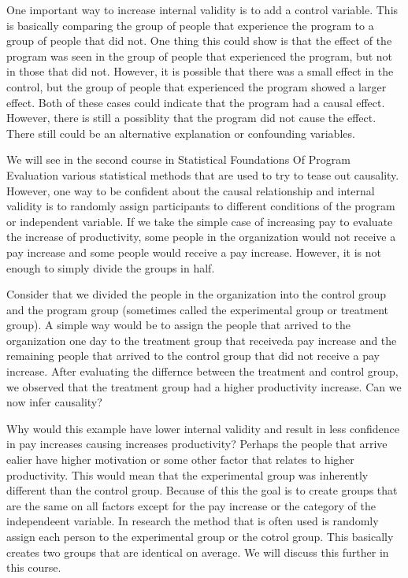 \documentclass[]{book}
\theoremstyle{definition}
\theoremstyle{definition}
\theoremstyle{definition}
\theoremstyle{remark}
\begin{document}
One important way to increase internal validity is to add a control
variable. This is basically comparing the group of people that
experience the program to a group of people that did not. One thing this
could show is that the effect of the program was seen in the group of
people that experienced the program, but not in those that did not.
However, it is possible that there was a small effect in the control,
but the group of people that experienced the program showed a larger
effect. Both of these cases could indicate that the program had a causal
effect. However, there is still a possiblity that the program did not
cause the effect. There still could be an alternative explanation or
confounding variables.

We will see in the second course in Statistical Foundations Of Program
Evaluation various statistical methods that are used to try to tease out
causality. However, one way to be confident about the causal
relationship and internal validity is to randomly assign participants to
different conditions of the program or independent variable. If we take
the simple case of increasing pay to evaluate the increase of
productivity, some people in the organization would not receive a pay
increase and some people would receive a pay increase. However, it is
not enough to simply divide the groups in half.

Consider that we divided the people in the organization into the control
group and the program group (sometimes called the experimental group or
treatment group). A simple way would be to assign the people that
arrived to the organization one day to the treatment group that
receiveda pay increase and the remaining people that arrived to the
control group that did not receive a pay increase. After evaluating the
differnce between the treatment and control group, we observed that the
treatment group had a higher productivity increase. Can we now infer
causality?

Why would this example have lower internal validity and result in less
confidence in pay increases causing increases productivity? Perhaps the
people that arrive ealier have higher motivation or some other factor
that relates to higher productivity. This would mean that the
experimental group was inherently different than the control group.
Because of this the goal is to create groups that are the same on all
factors except for the pay increase or the category of the independeent
variable. In research the method that is often used is randomly assign
each person to the experimental group or the cotrol group. This
basically creates two groups that are identical on average. We will
discuss this further in this course.
\end{document}
